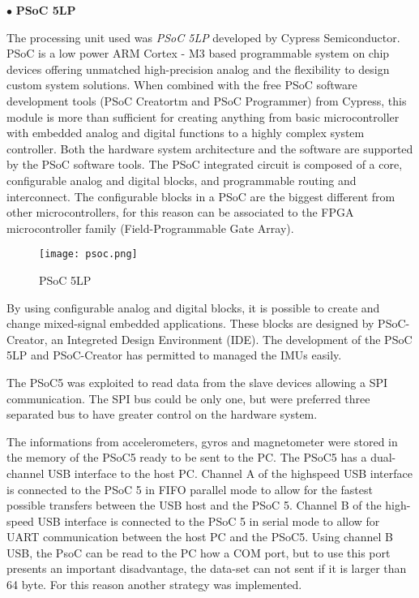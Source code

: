 \noindent $\bullet$ \textbf{PSoC 5LP} \textsuperscript \textregistered

\noindent The processing unit used was \textit{PSoC 5LP} developed by  Cypress Semiconductor. PSoC is a low power  ARM \textsuperscript \textregistered Cortex - M3 based programmable system on chip devices offering unmatched high-precision analog and the flexibility to design custom system solutions. When combined with the free PSoC software development tools (PSoC Creatortm and
PSoC Programmer) from Cypress, this module is more than sufficient for creating anything from basic microcontroller with embedded analog and digital functions to a highly complex system controller. Both the hardware system architecture and the software are supported by the PSoC
software tools. 
The PSoC integrated circuit is composed of a core, configurable analog and digital blocks, and programmable routing and interconnect. The configurable blocks in a PSoC are the biggest different from other microcontrollers, for this reason can be associated to the FPGA microcontroller family (Field-Programmable Gate Array). 
\begin{figure}[h]
\centering
\texttt{[image: psoc.png]}
\caption{PSoC 5LP}
\label{fig:psoc}
\end{figure}

By using configurable analog and digital blocks, it is possible to  create and change mixed-signal embedded applications. These blocks are designed by PSoC-Creator, an Integreted Design Environment (IDE).  
The development of the PSoC 5LP  and PSoC-Creator has permitted to managed  the IMUs easily. 

The PSoC5 was exploited to read data from the slave devices allowing a SPI communication. The SPI bus could be only one, but were preferred three separated bus to have greater control on the hardware system. 

The informations from accelerometers, gyros and magnetometer were stored in the  memory of the PSoC5 ready to be sent to the PC.  The PSoC5 has a dual-channel USB interface to the host PC. Channel A of the highspeed USB interface is connected to the PSoC 5 in FIFO parallel mode to allow for the fastest possible transfers between the USB host and the PSoC 5. Channel B of the high-speed USB interface is connected to the PSoC 5 in serial mode to allow for UART communication between the host PC and the PSoC5. Using channel B USB, the PsoC can be read to the PC how a COM port, but to use this port presents an important disadvantage, the data-set can not sent if it is larger than 64 byte. For this reason another strategy was implemented. \\
\newline

